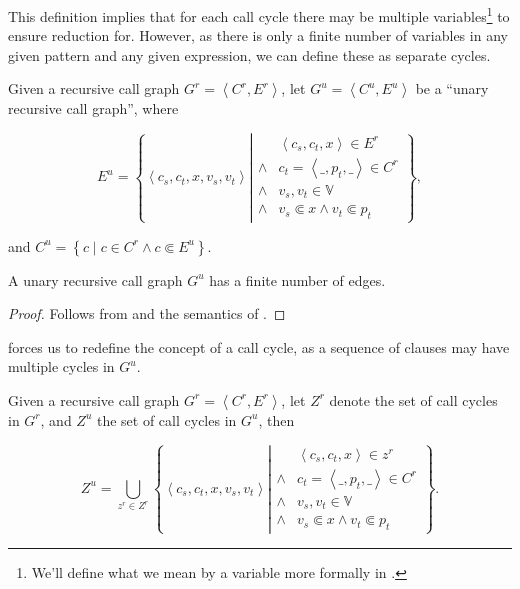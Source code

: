 This definition implies that for each call cycle there may be multiple
variables\footnote{We'll define what we mean by a variable more formally in
.} to ensure reduction for. However, as there is
only a finite number of variables in any given pattern and any given
expression, we can define these as separate cycles.

\begin{definition}\label{definition:variable-call-graph} Given a recursive call
graph $G^r = \left\langle C^r, E^r \right\rangle$, let $G^u= \left\langle C^u,
E^u \right\rangle$ be a ``unary recursive call graph'', where

$$E^u = \left\{ \left\langle c_s, c_t, x, v_s, v_t \right\rangle \left|
\begin{array}{ll}
&\left\langle c_s, c_t,x \right\rangle \in E^r\\
\wedge&c_t = \left\langle \_, p_t, \_ \right\rangle \in C^r \\
\wedge&v_s,v_t\in\mathbb{V}\\
\wedge&v_s\Subset x \wedge v_t \Subset p_t
\end{array}
\right.\right\},$$

and $C^u= \left\{ c \mid c \in C^r \wedge c\Subset E^u
\right\}$.\end{definition}

\begin{theorem} A unary recursive call graph $G^u$ has a finite number of
edges.\end{theorem}

\begin{proof} Follows from  and the
semantics of \D{}.\end{proof}

 forces us to redefine the concept of a
call cycle, as a sequence of clauses may have multiple cycles in $G^u$.

\begin{definition}\label{definition:variable-call-cycle} Given a recursive call
graph $G^r = \left\langle C^r, E^r \right\rangle$, let $Z^r$ denote the set of
call cycles in $G^r$, and $Z^u$ the set of call cycles in $G^u$, then

$$Z^u = \bigcup_{z^r\in Z^r} \left\{ \left\langle c_s, c_t, x, v_s, v_t \right\rangle \left|
\begin{array}{ll}
&\left\langle c_s, c_t,x \right\rangle \in z^r\\
\wedge&c_t = \left\langle \_, p_t, \_ \right\rangle \in C^r \\
\wedge&v_s,v_t\in\mathbb{V}\\
\wedge&v_s\Subset x \wedge v_t \Subset p_t
\end{array}
\right.\right\}.$$

\end{definition}

